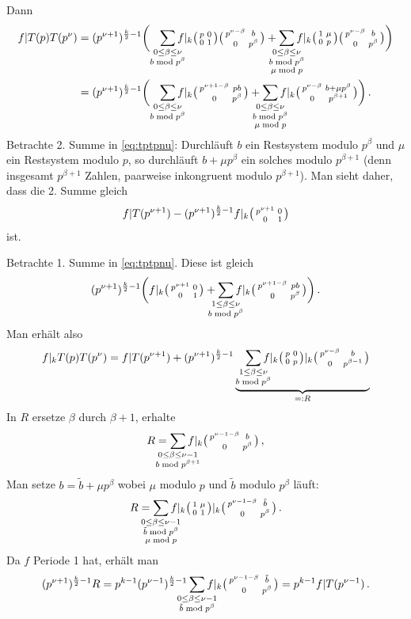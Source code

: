 \begin{bewe}
	Dann
	\begin{align}\label{eq:tptpnu}
	f|T(p)T(p^\nu)
	&= (p^{\nu+1})^{\frac{k}{2}-1} \biggl( \smashoperator[r]{\sum_{\substack{0 \leq \beta \leq \nu \\ b \bmod p^\beta}}} f|_k \mymat p001 \mymat {p^{\nu-\beta}}b0{p^\beta} + \smashoperator{\sum_{\substack{0 \leq \beta \leq \nu \\ b \bmod p^\beta \\ \mu\bmod p}}} f|_k \mymat 1\mu0p \mymat {p^{\nu-\beta}}b0{p^\beta} \biggr) \nonumber \\
	&= (p^{\nu+1})^{\frac{k}{2}-1} \biggl( \smashoperator[r]{\sum_{\substack{0 \leq \beta \leq \nu\\b \bmod p^\beta}}} f|_k \mymat {p^{\nu +1-\beta}}{pb}{0}{p^\beta} + \smashoperator{\sum_{\substack{0 \leq \beta \leq \nu \\ b \bmod p^\beta \\ \mu \bmod p}}} f|_k \mymat{p^{\nu-\beta}}{b+\mu p^\beta}0{p^{\beta+1}} \biggr)
	\,.
	\end{align}
	Betrachte 2. Summe in \eqref{eq:tptpnu}:
	Durchläuft $b$ ein Restsystem modulo $p^\beta$ und $\mu$ ein Restsystem modulo $p$, so durchläuft $b+\mu p^\beta$ ein solches modulo $p^{\beta+1}$ (denn insgesamt $p^{\beta+1}$ Zahlen, paarweise inkongruent modulo $p^{\beta+1}$).
	Man sieht daher, dass die 2. Summe gleich
	\[
	f|T(p^{\nu+1}) - (p^{\nu+1})^{\frac{k}{2}-1} f|_k \mymat {p^{\nu+1}}001
	\]
	ist.
	
	Betrachte 1. Summe in \eqref{eq:tptpnu}. Diese ist gleich
	\[
	(p^{\nu + 1})^{\frac{k}{2}-1} \biggl(f|_k \mymat{p^{\nu+1}}001 + \smashoperator{\sum_{\substack{1 \leq \beta \leq \nu \\ b \bmod p^\beta}}} f|_k \mymat{p^{\nu+1-\beta}}{pb}0{p^\beta} \biggr)
	\,.
	\]
	Man erhält also
	\[
	f|_k T(p)T(p^\nu)
	= f|T(p^{\nu+1}) + (p^{\nu+1})^{\frac{k}{2}-1}  \underbrace{\smashoperator[r]{\sum_{\substack{1 \leq \beta \leq \nu\\ b \bmod p^\beta}}} f|_k \mymat p00p |_k \mymat {p^{\nu-\beta}}b0{p^{\beta-1}}}_{=: R}
	\]
	In $R$ ersetze $\beta$ durch $\beta + 1$, erhalte
	\[
	R = \smashoperator{\sum_{\substack{0 \leq \beta \leq \nu-1\\ b \bmod p^{\beta+1}}}} f|_k \mymat {p^{\nu-1-\beta}}b0{p^{\beta}}
	\,,
	\]
	Man setze $b = \tilde b + \mu p^\beta$ wobei $\mu$ modulo $p$ und $\tilde b$ modulo $p^\beta$ läuft:
	\[
	R = \smashoperator{\sum_{\substack{ 0 \leq \beta \leq \nu-1\\ \tilde b \bmod p^\beta \\ \mu \bmod p}}} f|_k \mymat 1\mu01 |_k \mymat {p^{\nu-1-\beta}}{\tilde b}0{p^\beta}
	\,.
	\]
	Da $f$ Periode 1 hat, erhält man
	\[
	(p^{\nu+1})^{\frac{k}{2}-1}R
	= p^{k-1}(p^{\nu-1})^{\frac{k}{2}-1} \smashoperator{\sum_{\substack{0 \leq \beta \leq \nu-1 \\ \tilde b \bmod p^\beta}}} f|_k \mymat {p^{\nu-1-\beta}}{\tilde b}0{p^\beta}
	= p^{k-1} f|T(p^{\nu-1})
	\,.
	\]
	

\end{bewe}
